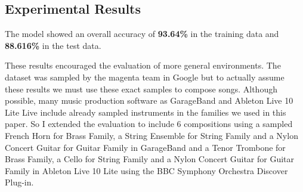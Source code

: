 \documentclass{article}
\begin{document}
\subsection{Experimental Results}
The model showed an overall accuracy of \textbf{93.64\%} in the training data and \textbf{88.616\%} in the test data.

These results encouraged the evaluation of more general environments. The dataset was sampled by the magenta team in Google but to actually assume these results we must use these exact samples to compose songs. Although possible, many music production software as GarageBand and Ableton Live 10 Lite Live include already sampled instruments in the families we used in this paper. So I extended the evaluation to include 6 compositions using a sampled French Horn for Brass Family, a String Ensemble for String Family and a Nylon Concert Guitar for Guitar Family in GarageBand and a Tenor Trombone for Brass Family, a Cello for String Family and a Nylon Concert Guitar for Guitar Family in Ableton Live 10 Lite using the BBC Symphony Orchestra Discover Plug-in.
\end{document}
